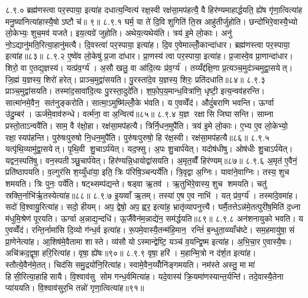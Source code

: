 ८.९.०
ब्रह्म॑णस्त्वा पर॒स्पाया॒ इत्या॑ह दधात्य॒न्वित्य॑ रक्ष॒स्वी रक्ष॑सा॒मप॑हत्यै॒ वै हिर॑ण्यमाहार्द्धयति॒ ह्ये॑ष गृ॑णा॒त्वित्या॑ह मनु॒ष्या॑नित्या॑हास्यै॒षोऽष्टौ च॑॥ ९॥
८.९.१
घर्म॒ या ते॑ दि॒वि शुगिति॑ ति॒स्र आहु॑तीर्जुहोति। छन्दो॑भिरे॒वास्यै॒भ्यो लो॒केभ्यः॒ शुच॒मव॑ यजते। इय॒त्यग्रे॑ जुहोति। अथेय॒त्यथेय॑ति। त्रय॑ इ॒मे लो॒काः। अनु॑ नो॒ऽद्यानु॑मति॒रित्या॒हानु॑मत्यै। दि॒वस्त्वा॑ पर॒स्पाया॒ इत्या॑ह। दि॒व ए॒वेमाल्लोँ॒कान्दा॑धार। ब्रह्म॑णस्त्वा पर॒स्पाया॒ इत्या॑ह॥८३॥
८.९.२
ए॒ष्वे॑व लो॒केषु॑ प्र॒जा दा॑धार। प्रा॒णस्य॑ त्वा पर॒स्पाया॒ इत्या॑ह। प्र॒जास्वे॒व प्रा॒णान्दा॑धार। शिरो॒ वा ए॒तद्य॒ज्ञस्य॑। यत्प्र॑व॒र्ग्य॑। अ॒सौ खलु॒ वा आ॑दि॒त्यः प्र॑व॒र्ग्य॑। तय्यँद्द॑क्षि॒णा प्र॒त्यञ्च॒मुद॑ञ्चमुद्वा॒सयेत्। जि॒ह्मं य॒ज्ञस्य॒ शिरो॑ हरेत्। प्राञ्च॒मुद्वा॑सयति। पु॒रस्ता॑दे॒व य॒ज्ञस्य॒ शिरः॒ प्रति॑दधाति॥८४॥
८.९.३
प्राञ्च॒मुद्वा॑सयति। तस्मा॑द॒सावा॑दि॒त्यः पु॒रस्ता॒दुदे॑ति। श॒फो॒प॒य॒मान्ध॒वित्रा॑णि॒ धृष्टी॒ इत्य॒न्वव॑हरन्ति। सात्मा॑नमे॒वैन॒ सत॑नुङ्करोति। सात्मा॒ऽमुष्मि॑ल्लोँ॒के भ॑वति। य ए॒वव्वेँद॑। औदुं॑बराणि भवन्ति। ऊर्ग्वा उ॑दु॒म्बर॑। ऊर्ज॑मे॒वाव॑रुन्धे। वर्त्म॑ना॒ वा अ॒न्वित्य॑॥८५॥
८.९.४
य॒ज्ञ रक्षासि जिघासन्ति। साम्ना प्रस्तो॒ताऽन्ववै॑ति। साम॒ वै र॑क्षो॒हा। रक्ष॑सा॒मप॑हत्यै। त्रिर्नि॒धन॒मुपै॑ति। त्रय॑ इ॒मे लो॒काः। ए॒भ्य ए॒व लो॒केभ्यो॒ रक्षा॒स्यप॑हन्ति। पुरु॑षःपुरुषो नि॒धन॒मुपै॑ति। पुरु॑षःपुरुषो॒ हि र॑क्ष॒स्वी। रक्ष॑सा॒मप॑हत्यै॥८६॥
८.९.५
यत्पृ॑थि॒व्यामु॑द्वा॒सयेत्। पृ॒थि॒वी शु॒चाऽर्प॑येत्। यद॒फ्सु। अ॒पः  शु॒चार्प॑येत्। यदोष॑धीषु। ओष॑धीः  शु॒चाऽर्प॑येत्। यद्वन॒स्पति॑षु। वन॒स्पतीञ्छु॒चार्प॑येत्। हिर॑ण्यन्नि॒धायोद्वा॑सयति। अ॒मृत॒व्वैँ हिर॑ण्यम्॥८७॥
८.९.६
अ॒मृत॑ ए॒वैनं॒ प्रति॑ष्ठापयति। व॒ल्गुर॑सि श॒य्युँधा॑या॒ इति॒ त्रिः प॑रिषि॒ञ्चन्पर्ये॑ति। त्रि॒वृद्वा अ॒ग्निः। यावा॑ने॒वाग्निः। तस्य॒ शुच शमयति। त्रिः पुनः॒ पर्ये॑ति। षट्थ्सम्प॑द्यन्ते। षड्वा ऋ॒तव॑। ऋ॒तुभि॑रे॒वास्य॒ शुच शमयति। चतु॑ स्रक्ति॒र्नाभि॑र्\mbox{}ऋ॒तस्येत्या॑ह॥८८॥
८.९.७
इ॒यव्वाँ ऋ॒तम्। तस्या॑ ए॒ष ए॒व नाभि॑। यत् प्र॑व॒र्ग्य॑। तस्मा॑दे॒वमा॑ह। सदो॑ वि॒श्वायु॒रित्या॑ह। सदो॒ हीयम्। अप॒ द्वेषो॒ अप॒ ह्वर॒ इत्या॑ह॒ भ्रातृ॑व्यापनुत्त्यै। घर्मै॒तत्तेऽन्न॑मे॒तत्पुरी॑ष॒मिति॑ द॒ध्ना म॑धुमि॒श्रेण॑ पूरयति। ऊर्ग्वा अ॒न्नाद्य॒न्दधि॑। ऊ॒र्जैवैन॑म॒न्नाद्ये॑न॒ सम॑र्द्धयति॥८९॥
८.९.८
अन॑शनायुको भवति। य ए॒वव्वेँद॑। रन्ति॒र्नामा॑सि दि॒व्यो ग॑न्ध॒र्व इत्या॑ह। रू॒पमे॒वास्यै॒तन्म॑हि॒मान॒ रन्तिं॑ ब॒न्धुता॒व्व्याँच॑ष्टे। सम॒हमायु॑षा॒ सं प्रा॒णेनेत्या॑ह। आ॒शिष॑मे॒वैतामा शास्ते। व्य॑सौ योऽस्मान्द्वेष्टि॒ यञ्च॑ व॒यन्द्वि॒ष्म इत्या॑ह। अ॒भि॒चा॒र ए॒वास्यै॒षः। अचि॑क्रद॒द्वृषा॒ हरि॒रित्या॑ह। वृषा॒ ह्ये॑षः॥९०॥
८.९.९
वृषा॒ हरि॑। म॒हान्मि॒त्रो न द॑र्\mbox{}श॒त इत्या॑ह। स्तौत्ये॒वैन॑मे॒तत्। चिद॑सि समु॒द्रयो॑नि॒रित्या॑ह। स्वामे॒वैन॒य्योँनि॑ङ्गमयति। नम॑स्ते अस्तु॒ मा मा॑ हिसी॒रित्या॒हाहिसायै। वि॒श्वाव॑सु सोम गन्ध॒र्वमित्या॑ह। यदे॒वास्य॑ क्रि॒यमा॑णस्यान्त॒र्यन्ति॑। तदे॒वास्यै॒तेना प्या॑ययति। वि॒श्वाव॑सुर॒भि तन्नो॑ गृणा॒त्वित्या॑ह॥९१॥
